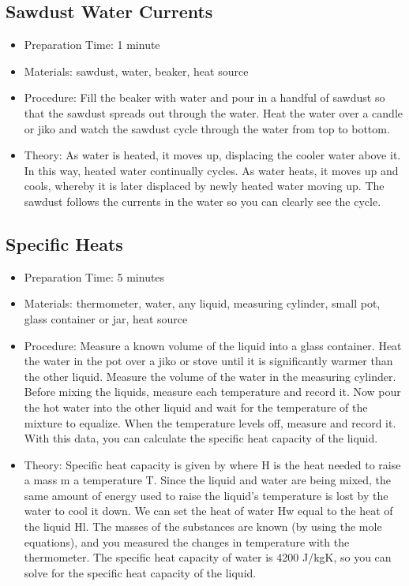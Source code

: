 \subsection{Sawdust Water Currents}
\begin{itemize}
\item{Preparation Time: 1 minute}
\item{Materials: sawdust, water, beaker, heat source}
\item{Procedure: Fill the beaker with water and pour in a handful of sawdust so that the sawdust spreads out through the water. Heat the water over a candle or jiko and watch the sawdust cycle through the water from top to bottom.}
\item{Theory: As water is heated, it moves up, displacing the cooler water above it. In this way, heated water continually cycles. As water heats, it moves up and cools, whereby it is later displaced by newly heated water moving up. The sawdust follows the currents in the water so you can clearly see the cycle.}
\end{itemize}

\subsection{Specific Heats}
\begin{itemize}
\item{Preparation Time: 5 minutes}
\item{Materials: thermometer, water, any liquid, measuring cylinder, small pot, glass container or jar, heat source}
\item{Procedure: Measure a known volume of the liquid into a glass container. Heat the water in the pot over a jiko or stove until it is significantly warmer than the other liquid. Measure the volume of the water in the measuring cylinder. Before mixing the liquids, measure each temperature and record it. Now pour the hot water into the other liquid and wait for the temperature of the mixture to equalize. When the temperature levels off, measure and record it. With this data, you can calculate the specific heat capacity of the liquid.}
\item{Theory: Specific heat capacity is given by where H is the heat needed to raise a mass m a temperature T. Since the liquid and water are being mixed, the same amount of energy used to raise the liquid’s temperature is lost by the water to cool it down. We can set the heat of water Hw equal to the heat of the liquid Hl. The masses of the substances are known (by using the mole equations), and you measured the changes in temperature with the thermometer. The specific heat capacity of water is 4200 J/kgK, so you can solve for the specific heat capacity of the liquid.}
\end{itemize}

